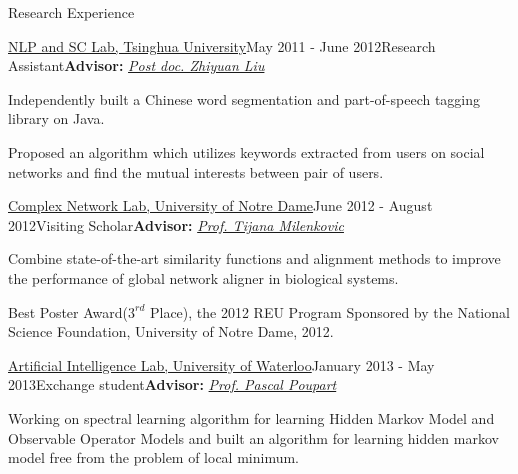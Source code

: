 \documentclass{resume} %
\begin{document}
\begin{rSection}{Research Experience}
\begin{rSubsection}{\href{http://nlp.csai.tsinghua.edu.cn}{NLP and SC Lab, Tsinghua University}}{May 2011 - June 2012}{Research Assistant}{\textbf{Advisor: }\href{http://nlp.csai.tsinghua.edu.cn/~lzy/}{\textit{Post doc. Zhiyuan Liu}}}
\item Independently built a Chinese word segmentation and part-of-speech tagging
library on Java.
\item Proposed an algorithm which utilizes keywords extracted from users on social
networks and find the mutual interests between pair of users.
\end{rSubsection}


\begin{rSubsection}{\href{http://www3.nd.edu/~cone/}{Complex Network Lab, University of Notre Dame}}{June 2012 - August 2012}{Visiting Scholar}{\textbf{Advisor: }\href{http://www.cse.nd.edu/~tmilenko/}{\textit{Prof. Tijana Milenkovic}}}
\item Combine state-of-the-art similarity functions and alignment methods to improve
the performance of global network aligner in biological systems.
\item Best Poster Award($3^{rd}$ Place), the 2012 REU Program Sponsored by the National
Science Foundation, University of Notre Dame, 2012.
\end{rSubsection}

\begin{rSubsection}{\href{http://ai.uwaterloo.ca/index.html}{Artificial Intelligence Lab, University of Waterloo}}{January 2013 - May 2013}{Exchange student}{\textbf{Advisor: }{\href{https://cs.uwaterloo.ca/~ppoupart/}{\textit{Prof. Pascal Poupart}}}}
\item{}Working on spectral learning algorithm for learning Hidden Markov Model and
Observable Operator Models and built an algorithm for learning hidden markov model free from the problem of local minimum.
\end{rSubsection}

\end{rSection}
\end{document}
